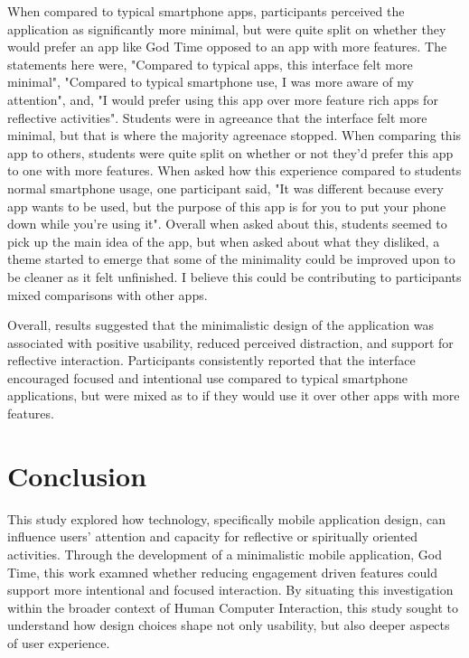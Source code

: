 \documentclass[12pt]{article}
\begin{document}
When compared to typical smartphone apps, participants perceived the application as significantly more minimal, but were quite split on whether they would prefer an app like God Time opposed to an app with more features. The statements here were, "Compared to typical apps, this interface felt more minimal", "Compared to typical smartphone use, I was more aware of my attention", and, "I would prefer using this app over more feature rich apps for reflective activities". Students were in agreeance that the interface felt more minimal, but that is where the majority agreenace stopped. When comparing this app to others, students were quite split on whether or not they'd prefer this app to one with more features. When asked how this experience compared to students normal smartphone usage, one participant said, "It was different because every app wants to be used, but the purpose of this app is for you to put your phone down while you're using it". Overall when asked about this, students seemed to pick up the main idea of the app, but when asked about what they disliked, a theme started to emerge that some of the minimality could be improved upon to be cleaner as it felt unfinished. I believe this could be contributing to participants mixed comparisons with other apps. 

Overall, results suggested that the minimalistic design of the application was associated with positive usability, reduced perceived distraction, and support for reflective interaction. Participants consistently reported that the interface encouraged focused and intentional use compared to typical smartphone applications, but were mixed as to if they would use it over other apps with more features.


\section{Conclusion}

This study explored how technology, specifically mobile application design, can influence users' attention and capacity for reflective or spiritually oriented activities. Through the development of a minimalistic mobile application, God Time, this work examned whether reducing engagement driven features could support more intentional and focused interaction. By situating this investigation within the broader context of Human Computer Interaction, this study sought to understand how design choices shape not only usability, but also deeper aspects of user experience. 
\end{document}

